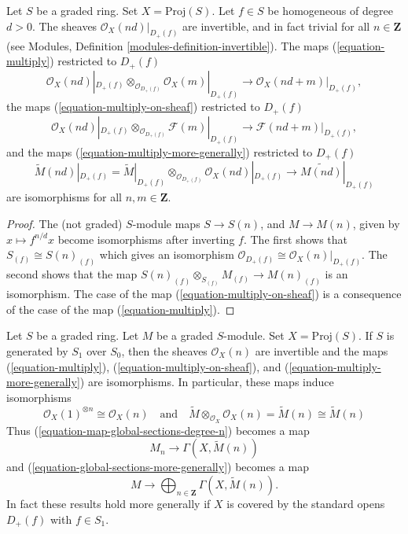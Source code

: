 \begin{lemma}
\label{lemma-when-invertible}
Let $S$ be a graded ring. Set $X = \text{Proj}(S)$.
Let $f \in S$ be homogeneous of degree $d > 0$.
The sheaves $\mathcal{O}_X(nd)|_{D_{+}(f)}$ are invertible,
and in fact trivial for all $n \in \mathbf{Z}$
(see Modules, Definition \ref{modules-definition-invertible}).
The maps (\ref{equation-multiply}) restricted to $D_{+}(f)$
$$
\mathcal{O}_X(nd)|_{D_{+}(f)} \otimes_{\mathcal{O}_{D_{+}(f)}}
\mathcal{O}_X(m)|_{D_{+}(f)}
\longrightarrow
\mathcal{O}_X(nd + m)|_{D_{+}(f)},
$$
the maps (\ref{equation-multiply-on-sheaf}) restricted to $D_+(f)$
$$
\mathcal{O}_X(nd)|_{D_{+}(f)} \otimes_{\mathcal{O}_{D_{+}(f)}}
\mathcal{F}(m)|_{D_{+}(f)}
\longrightarrow
\mathcal{F}(nd + m)|_{D_{+}(f)},
$$
and the maps (\ref{equation-multiply-more-generally})
restricted to $D_{+}(f)$
$$
\widetilde M(nd)|_{D_{+}(f)}
=
\widetilde M|_{D_{+}(f)}
\otimes_{\mathcal{O}_{D_{+}(f)}}
\mathcal{O}_X(nd)|_{D_{+}(f)}
\longrightarrow
\widetilde{M(nd)}|_{D_{+}(f)}
$$
are isomorphisms for all $n, m \in \mathbf{Z}$.
\end{lemma}

\begin{proof}
The (not graded) $S$-module maps
$S \to S(n)$, and $M \to M(n)$, given by
$x \mapsto f^{n/d}x$ become isomorphisms
after inverting $f$. The first shows that
$S_{(f)} \cong S(n)_{(f)}$ which gives an isomorphism
$\mathcal{O}_{D_{+}(f)} \cong \mathcal{O}_X(n)|_{D_{+}(f)}$.
The second shows that the map
$S(n)_{(f)} \otimes_{S_{(f)}} M_{(f)} \to M(n)_{(f)}$
is an isomorphism. The case of the map (\ref{equation-multiply-on-sheaf})
is a consequence of the case of the map (\ref{equation-multiply}).
\end{proof}

\begin{lemma}
\label{lemma-apply-modules}
Let $S$ be a graded ring. Let $M$ be a graded $S$-module.
Set $X = \text{Proj}(S)$. If $S$ is generated by $S_1$
over $S_0$, then the sheaves $\mathcal{O}_X(n)$
are invertible and the maps
(\ref{equation-multiply}), (\ref{equation-multiply-on-sheaf}), and
(\ref{equation-multiply-more-generally}) are isomorphisms.
In particular, these maps induce isomorphisms
$$
\mathcal{O}_X(1)^{\otimes n} \cong
\mathcal{O}_X(n)
\quad
\text{and}
\quad
\widetilde{M} \otimes_{\mathcal{O}_X} \mathcal{O}_X(n) =
\widetilde{M}(n) \cong \widetilde{M}(n)
$$
Thus (\ref{equation-map-global-sections-degree-n}) becomes a map
\begin{equation}
\label{equation-map-global-sections-degree-n-simplified}
M_n \longrightarrow \Gamma(X, \widetilde{M}(n))
\end{equation}
and (\ref{equation-global-sections-more-generally}) becomes a map
\begin{equation}
\label{equation-global-sections-more-generally-simplified}
M \longrightarrow
\bigoplus\nolimits_{n \in \mathbf{Z}} \Gamma(X, \widetilde{M}(n)).
\end{equation}
In fact these results hold more generally if $X$ is covered by the standard
opens $D_{+}(f)$ with $f \in S_1$.
\end{lemma}

